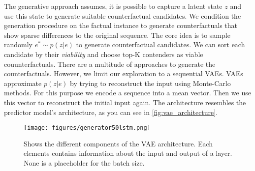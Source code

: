 \documentclass[./../../paper.tex]{subfiles}
\begin{document}




The generative approach assumes, it is possible to capture a latent state $z$ and use this state to generate suitable counterfactual candidates. We condition the generation procedure on the factual instance to generate counterfactuals that show sparse differences to the original sequence. The core idea is to sample randomly $e^* \sim p(z|e)$ to generate counterfactual candidates. We can sort each candidate by their \emph{viability} and choose top-K contenders as viable couunterfactuals. There are a multitude of approaches to generate the counterfactuals. However, we limit our exploration to a sequential \glspl{VAE}. 
\glspl{VAE} approximate $p(z|e)$ by trying to reconstruct the input using Monte-Carlo methods. For this purpose we encode a sequence into a mean vector. Then we use this vector to reconstruct the initial input again. The architecture resembles the predictor model's architecture, as you can see in \autoref{fig:vae_architecture}.   

\begin{figure}[htbp]
    \centering
    \texttt{[image: figures/generator50lstm.png]}
    \caption{Shows the different components of the VAE architecture. Each elements contains information about the input and output of a layer. None is a placeholder for the batch size.}
    \label{fig:vae_architecture}
\end{figure}
\end{document}
